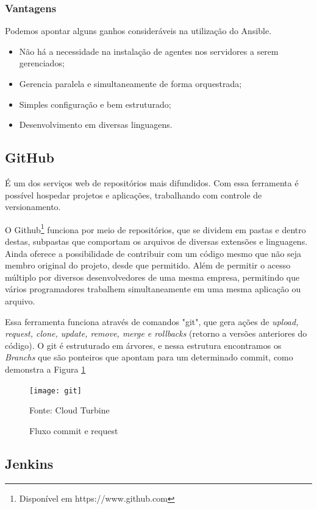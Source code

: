 \subsubsection{Vantagens}
Podemos apontar alguns ganhos consideráveis na utilização do Ansible.
\begin{itemize}
	\item Não há a necessidade na instalação de agentes nos servidores a serem gerenciados;
	\item Gerencia paralela e simultaneamente de forma orquestrada; 
	\item Simples configuração e bem estruturado;
	\item Desenvolvimento em diversas linguagens.
\end{itemize}

\subsection{GitHub }
É um dos serviços web de repositórios mais difundidos. Com essa ferramenta é possível hospedar projetos e aplicações, trabalhando com controle de versionamento.

O Github\footnote{Disponível em https://www.github.com} funciona por meio de repositórios, que se dividem em pastas e dentro destas, subpastas que comportam os arquivos de diversas extensões e linguagens. Ainda oferece a possibilidade de contribuir com um código mesmo que não seja membro original do projeto, desde que permitido. Além de permitir o acesso múltiplo por diversos desenvolvedores de uma mesma empresa, permitindo que vários programadores trabalhem simultaneamente em uma mesma aplicação ou arquivo.\cite{bell2015introduccao}

Essa ferramenta funciona através de comandos "git", que gera ações de \textit{upload, request, clone, update, remove, merge e rollbacks} (retorno a versões anteriores do código). O git é estruturado em árvores, e nessa estrutura encontramos os \textit{Branchs} que são ponteiros que apontam para um determinado commit, como demonstra a Figura \ref{fig:git}

\begin{figure} [htb]
	\centering
	\texttt{[image: git]}
	\caption{Fluxo commit e request}
	Fonte: Cloud Turbine\footnotemark
	\label{fig:git}
\end{figure}

\subsection{Jenkins}

